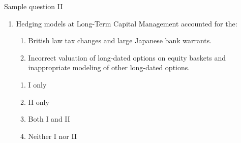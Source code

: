 \begin{frame}{Sample question II}

\begin{enumerate}
	\item Hedging models at Long-Term Capital Management accounted for the:
	\begin{enumerate}[I]
		\item British law tax changes and large Japanese bank warrants.
		\item Incorrect valuation of long-dated options on equity baskets and inappropriate
		modeling of other long-dated options.
	\end{enumerate}
	\begin{enumerate}[A]
		\item I only
		\item II only
		\item Both I and II
		\item {\color{red}Neither I nor II}
	\end{enumerate}
\end{enumerate}

\end{frame}